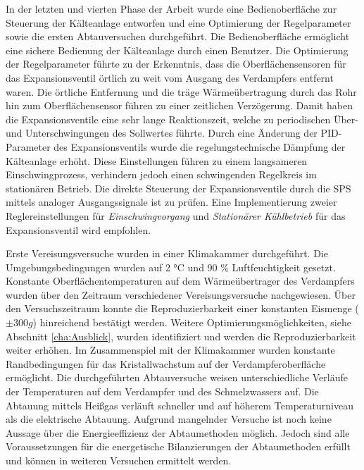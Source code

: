 In der letzten und vierten Phase der Arbeit wurde eine Bedienoberfläche zur Steuerung der Kälteanlage entworfen und eine Optimierung der Regelparameter sowie die ersten Abtauversuchen durchgeführt. Die Bedienoberfläche ermöglicht eine sichere Bedienung der Kälteanlage durch einen Benutzer. Die Optimierung der Regelparameter führte zu der Erkenntnis, dass die Oberflächensensoren für das Expansionsventil örtlich zu weit vom Ausgang des Verdampfers entfernt waren. Die örtliche Entfernung und die träge Wärmeübertragung durch das Rohr hin zum Oberflächensensor führen zu einer zeitlichen Verzögerung.  Damit haben die Expansionsventile eine sehr lange Reaktionszeit, welche zu periodischen Über- und Unterschwingungen des Sollwertes führte. Durch eine Änderung der PID-Parameter des Expansionsventils wurde die regelungstechnische Dämpfung der Kälteanlage erhöht. Diese Einstellungen führen zu einem langsameren Einschwingprozess, verhindern jedoch einen schwingenden Regelkreis im stationären Betrieb. Die direkte Steuerung der Expansionsventile durch die SPS mittels analoger Ausgangssignale ist zu prüfen. Eine Implementierung zweier Reglereinstellungen für \textit{Einschwingvorgang} und \textit{Stationärer Kühlbetrieb} für das Expansionsventil wird empfohlen.

Erste Vereisungsversuche wurden in einer Klimakammer durchgeführt. Die Umgebungsbedingungen wurden auf 2 °C und 90 $\%$ Luftfeuchtigkeit gesetzt. Konstante Oberflächentemperaturen auf dem Wärmeübertrager des Verdampfers  wurden über den Zeitraum verschiedener Vereisungsversuche nachgewiesen. Über den Versuchszeitraum konnte die Reproduzierbarkeit einer konstanten Eismenge ($\pm 300 g$)  hinreichend bestätigt werden. Weitere Optimierungsmöglichkeiten, siehe Abschnitt \ref{cha:Ausblick}, wurden identifiziert und werden die Reproduzierbarkeit weiter erhöhen. Im Zusammenspiel mit der Klimakammer wurden konstante Randbedingungen für das Kristallwachstum auf der Verdampferoberfläche ermöglicht. 
Die durchgeführten Abtauversuche weisen unterschiedliche Verläufe der Temperaturen auf dem Verdampfer und des Schmelzwassers auf. Die Abtauung mittels Heißgas verläuft schneller und auf höherem Temperaturniveau als die elektrische Abtauung. Aufgrund mangelnder Versuche ist noch keine Aussage über die Energieeffizienz der Abtaumethoden möglich. Jedoch sind alle Voraussetzungen für die energetische Bilanzierungen der Abtaumethoden erfüllt und können in weiteren Versuchen ermittelt werden. 


 

 